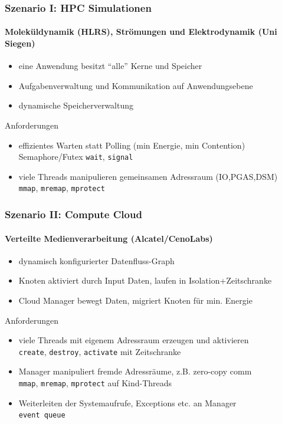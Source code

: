 \begin{frame}
  \frametitle{Szenario I: HPC Simulationen}
  \framesubtitle{Moleküldynamik (HLRS), Strömungen und Elektrodynamik (Uni Siegen)}

  \begin{itemize}
  \item eine Anwendung besitzt ``alle'' Kerne und Speicher
  \item Aufgabenverwaltung und Kommunikation auf Anwendungsebene
  \item dynamische Speicherverwaltung
  \end{itemize}

  \begin{block}{Anforderungen}
    \begin{itemize}
    \item effizientes Warten statt Polling (min Energie, min Contention)\\
      Semaphore/Futex \texttt{wait}, \texttt{signal}
    \item viele Threads manipulieren gemeinsamen Adressraum (IO,PGAS,DSM)\\
      \texttt{mmap}, \texttt{mremap}, \texttt{mprotect}
    \end{itemize}
  \end{block}
\end{frame}

\begin{frame}
  \frametitle{Szenario II: Compute Cloud}
  \framesubtitle{Verteilte Medienverarbeitung (Alcatel/CenoLabs)}

  \begin{itemize}
  \item dynamisch konfigurierter Datenfluss-Graph
  \item Knoten aktiviert durch Input Daten, laufen in Isolation+Zeitschranke
  \item Cloud Manager bewegt Daten, migriert Knoten für min. Energie
  \end{itemize}

  \begin{block}{Anforderungen}
    \begin{itemize}
    \item viele Threads mit eigenem Adressraum erzeugen und aktivieren\\
      \texttt{create}, \texttt{destroy}, \texttt{activate} mit Zeitschranke
    \item Manager manipuliert fremde Adressräume, z.B. zero-copy comm\\
      \texttt{mmap}, \texttt{mremap}, \texttt{mprotect} auf Kind-Threads
    \item Weiterleiten der Systemaufrufe, Exceptions etc. an Manager\\
      \texttt{event queue}
    \end{itemize}
  \end{block}
\end{frame}

